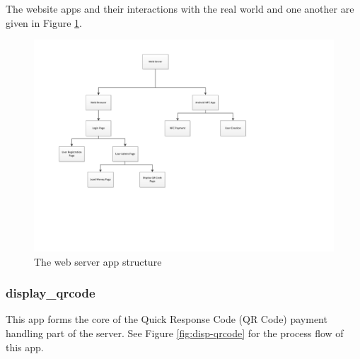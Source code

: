 The website apps and their interactions with the real world and one another
are given in Figure \ref{fig:website-apps}. 

\begin{figure}[h]
 \centering 
 \includegraphics[clip=true, trim = 0 130 130 30,
 scale=0.7]{website_structure}
 \caption{The web server app structure}
 \label{fig:website-apps}
\end{figure}

\subsubsection{display\_qrcode}

This app forms the core of the Quick Response Code (QR Code) payment handling part of the
server. See Figure \ref{fig:disp-qrcode} for the process flow of this app.

